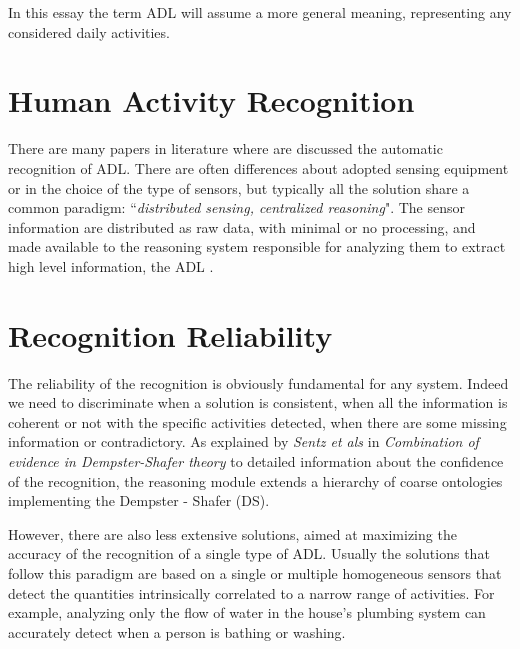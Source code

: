 \documentclass{thesisreport}
\begin{document}
In this essay the term ADL will assume a more general meaning, representing any  considered daily activities. 


\section{Human Activity Recognition}
There are many papers in literature where are discussed the automatic recognition of ADL. There are often differences about adopted sensing equipment or in the choice of the type of sensors, but typically all the solution share a common paradigm: ``\textit{distributed sensing, centralized reasoning}". The sensor information are distributed as raw data, with minimal or no processing, and made available to the reasoning system responsible for analyzing them to extract high level information, the ADL \cite{buoncompagni2017towards}.   


\section{Recognition Reliability} \label{reliability}
The reliability of the recognition is obviously fundamental for any system. Indeed we need to discriminate when a solution is consistent, when all the information is coherent or not with the specific activities detected, when there are some missing information or contradictory.
As explained by \textit{Sentz et als} in \textit{Combination of evidence in Dempster-Shafer theory} \cite{sentz2002combination} to detailed information about the confidence of the recognition, the reasoning module extends a hierarchy of coarse ontologies implementing the Dempster - Shafer (DS). 

However, there are also less extensive solutions, aimed at maximizing the accuracy of the recognition of a single type of ADL. Usually the solutions that follow this paradigm are based on a single or multiple homogeneous sensors that detect the quantities intrinsically correlated to a narrow range of activities. For example, analyzing only the flow of water in the house's plumbing system can accurately detect when a person is bathing or washing.
\end{document}
